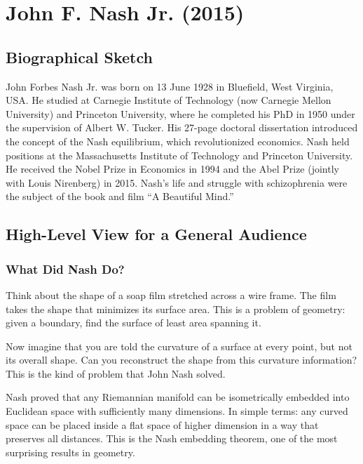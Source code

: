 \chapter{John F. Nash Jr. (2015)}

\section{Biographical Sketch}

John Forbes Nash Jr. was born on 13 June 1928 in Bluefield, West Virginia, USA. He studied at Carnegie Institute of Technology (now Carnegie Mellon University) and Princeton University, where he completed his PhD in 1950 under the supervision of Albert W. Tucker. His 27-page doctoral dissertation introduced the concept of the Nash equilibrium, which revolutionized economics. Nash held positions at the Massachusetts Institute of Technology and Princeton University. He received the Nobel Prize in Economics in 1994 and the Abel Prize (jointly with Louis Nirenberg) in 2015. Nash's life and struggle with schizophrenia were the subject of the book and film ``A Beautiful Mind.''

\section{High-Level View for a General Audience}

\subsection{What Did Nash Do?}

Think about the shape of a soap film stretched across a wire frame. The film takes the shape that minimizes its surface area. This is a problem of geometry: given a boundary, find the surface of least area spanning it.

Now imagine that you are told the curvature of a surface at every point, but not its overall shape. Can you reconstruct the shape from this curvature information? This is the kind of problem that John Nash solved.

Nash proved that any Riemannian manifold can be isometrically embedded into Euclidean space with sufficiently many dimensions. In simple terms: any curved space can be placed inside a flat space of higher dimension in a way that preserves all distances. This is the Nash embedding theorem, one of the most surprising results in geometry.

